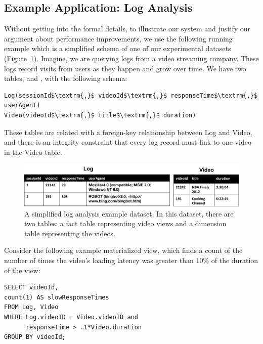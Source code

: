 \subsection{Example Application: Log Analysis}

Without getting into the formal details, to illustrate our system and justify our argument about performance improvements, we use the following running example which is a 
simplified schema of one of our experimental datasets (Figure~\ref{example-1}).
Imagine, we are querying logs from a video streaming company. 
These logs record visits from users as they happen and grow over time.
We have two tables,  and , with the following schema:

\begin{lstlisting}[mathescape]
Log(sessionId$\textrm{,}$ videoId$\textrm{,}$ responseTime$\textrm{,}$ userAgent)
Video(videoId$\textrm{,}$ title$\textrm{,}$ duration)
\end{lstlisting}
These tables are related with a foreign-key relationship between
Log and Video, and there is an integrity constraint that every log
record must link to one video in the Video table.

\begin{figure}[ht!] 
\centering
\vspace{-0.75em}
 \includegraphics[width=\columnwidth]{figs/sample-clean-example.png}\vspace{-0.25em}
 \caption{A simplified log analysis example dataset. In this dataset, there are two tables: a fact table representing video views and a dimension table representing the videos.\label{example-1}}
\end{figure}

Consider the following example materialized view, which finds a count of the number of times the video's loading latency was greater than 10\% of the duration of the view:

\vspace{0.5em}

\begin{lstlisting} 
SELECT videoId, 
count(1) AS slowResponseTimes 
FROM Log, Video
WHERE Log.videoID = Video.videoID and
	  responseTime > .1*Video.duration
GROUP BY videoId;
\end{lstlisting}

